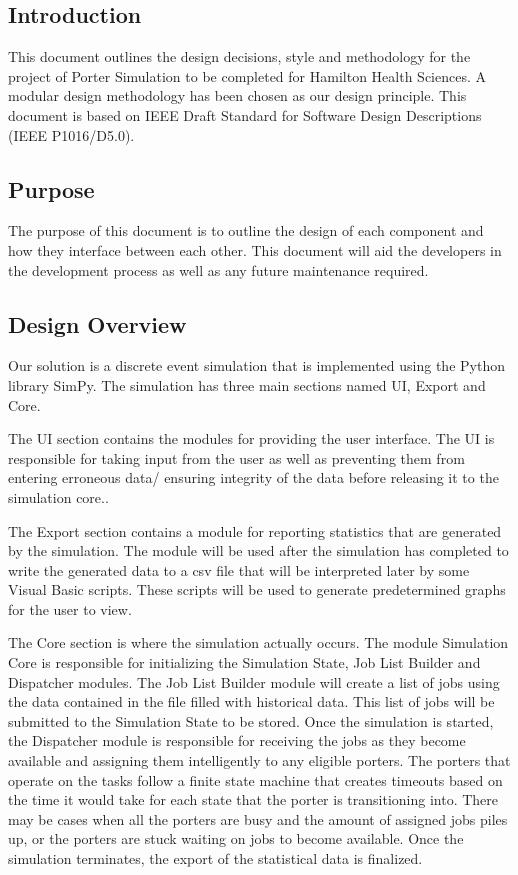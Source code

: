 \documentclass[paper=letter, fontsize=10pt]{scrartcl}
\numberwithin{equation}{section}		%
\numberwithin{figure}{section}			%
\numberwithin{table}{section}				%
\begin{document}
\subsection{Introduction}
This document outlines the design decisions, style and methodology for the project of Porter Simulation to be completed for Hamilton Health Sciences.  A modular design methodology has been chosen as our design principle.  This document is based on IEEE Draft Standard for Software Design Descriptions (IEEE P1016/D5.0).
\subsection{Purpose}
The purpose of this document is to outline the design of each component and how they interface between each other. This document will aid the developers in the development process as well as any future maintenance required.
\subsection{Design Overview}
Our solution is a discrete event simulation that is implemented using the Python library SimPy. The simulation has three main sections named UI, Export and Core. 

The UI section contains the modules for providing the user interface. The UI is responsible for taking input from the user as well as preventing them from entering erroneous data/ ensuring integrity of the data before releasing it to the simulation core..

The Export section contains a module for reporting statistics that are generated by the simulation. The module will be used after the simulation has completed to write the generated data to a csv file that will be interpreted later by some Visual Basic scripts. These scripts will be used to generate predetermined graphs for the user to view.

The Core section is where the simulation actually occurs. The module Simulation Core is responsible for initializing the Simulation State, Job List Builder and Dispatcher modules. The Job List Builder module will create a list of jobs using the data contained in the file filled with historical data. This list of jobs will be submitted to the Simulation State to be stored. Once the simulation is started, the Dispatcher module is responsible for receiving the jobs as they become available and assigning them intelligently to any eligible porters. The porters that operate on the tasks follow a finite state machine that creates timeouts based on the time it would take for each state that the porter is transitioning into. There may be cases when all the porters are busy and the amount of assigned jobs piles up, or the porters are stuck waiting on jobs to become available. Once the simulation terminates, the export of the statistical data is finalized.
\end{document}
